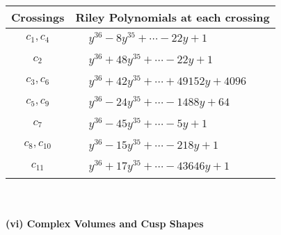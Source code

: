 \documentclass[1p]{elsarticle_modified}
\theoremstyle{definition}
\begin{document}
\begin{tabular}{m{50pt}|m{274pt}}
Crossings & \hspace{64pt}Riley Polynomials at each crossing \\
\hline $$\begin{aligned}c_{1},c_{4}\end{aligned}$$&$\begin{aligned}
&y^{36}-8 y^{35}+\cdots-22 y+1
\end{aligned}$\\
\hline $$\begin{aligned}c_{2}\end{aligned}$$&$\begin{aligned}
&y^{36}+48 y^{35}+\cdots-22 y+1
\end{aligned}$\\
\hline $$\begin{aligned}c_{3},c_{6}\end{aligned}$$&$\begin{aligned}
&y^{36}+42 y^{35}+\cdots+49152 y+4096
\end{aligned}$\\
\hline $$\begin{aligned}c_{5},c_{9}\end{aligned}$$&$\begin{aligned}
&y^{36}-24 y^{35}+\cdots-1488 y+64
\end{aligned}$\\
\hline $$\begin{aligned}c_{7}\end{aligned}$$&$\begin{aligned}
&y^{36}-45 y^{35}+\cdots-5 y+1
\end{aligned}$\\
\hline $$\begin{aligned}c_{8},c_{10}\end{aligned}$$&$\begin{aligned}
&y^{36}-15 y^{35}+\cdots-218 y+1
\end{aligned}$\\
\hline $$\begin{aligned}c_{11}\end{aligned}$$&$\begin{aligned}
&y^{36}+17 y^{35}+\cdots-43646 y+1
\end{aligned}$\\
\hline
\end{tabular}\\~\\
\newpage\flushleft \textbf{(vi) Complex Volumes and Cusp Shapes}
\end{document}
